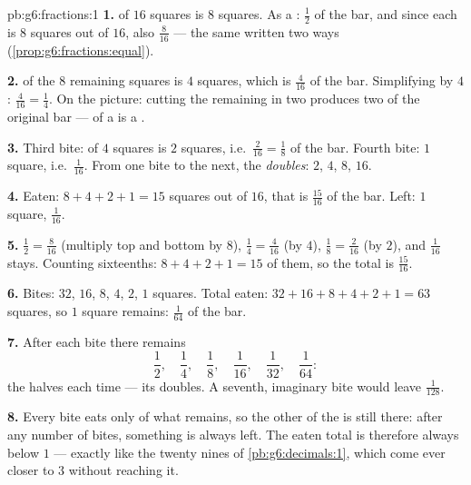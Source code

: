 \begin{solution}{pb:g6:fractions:1}
\textbf{1.}  of $16$ squares is $8$ squares. As a :
$\frac12$ of the bar, and since each  is $8$ squares out of
$16$, also $\frac{8}{16}$ --- the same  written two ways
(\cref{prop:g6:fractions:equal}).

\textbf{2.}  of the $8$ remaining squares is $4$ squares,
which is $\frac{4}{16}$ of the bar. Simplifying by $4$:
$\frac{4}{16} = \frac14$. On the picture: cutting the remaining
 in two produces two  of the original bar ---  of
a  is a .

\textbf{3.} Third bite:  of $4$ squares is $2$ squares, i.e.\
$\frac{2}{16} = \frac18$ of the bar. Fourth bite: $1$ square,
i.e.\ $\frac{1}{16}$. From one bite to the next, the 
\emph{doubles}: $2$, $4$, $8$, $16$.

\textbf{4.} Eaten: $8 + 4 + 2 + 1 = 15$ squares out of $16$, that
is $\frac{15}{16}$ of the bar. Left: $1$ square, $\frac{1}{16}$.

\textbf{5.} $\frac12 = \frac{8}{16}$ (multiply top and bottom by
$8$), $\frac14 = \frac{4}{16}$ (by $4$), $\frac18 = \frac{2}{16}$
(by $2$), and $\frac{1}{16}$ stays. Counting sixteenths:
$8 + 4 + 2 + 1 = 15$ of them, so the total is $\frac{15}{16}$.

\textbf{6.} Bites: $32$, $16$, $8$, $4$, $2$, $1$ squares. Total
eaten: $32 + 16 + 8 + 4 + 2 + 1 = 63$ squares, so $1$ square
remains: $\frac{1}{64}$ of the bar.

\textbf{7.} After each bite there remains
\[
\frac12,\quad \frac14,\quad \frac18,\quad \frac{1}{16},\quad
\frac{1}{32},\quad \frac{1}{64} :
\]
the  halves each time --- its  doubles. A
seventh, imaginary bite would leave $\frac{1}{128}$.

\textbf{8.} Every bite eats only \emph{} of what remains, so
the other \omterm{def:g3:division:half}{half} of the  is still there: after any number
of bites, something is always left. The eaten total is therefore
always below $1$ --- exactly like the twenty nines of
\cref{pb:g6:decimals:1}, which come ever closer to $3$ without
reaching it.


\end{solution}

